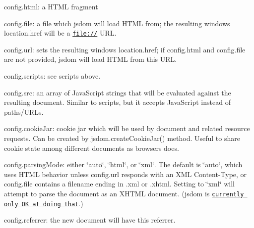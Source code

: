 \begin{DoxyItemize}
\item {\ttfamily config.\+html}\+: a H\+T\+ML fragment
\item {\ttfamily config.\+file}\+: a file which jsdom will load H\+T\+ML from; the resulting window\textquotesingle{}s {\ttfamily location.\+href} will be a {\ttfamily \href{file://}{\tt file\+://}} U\+RL.
\item {\ttfamily config.\+url}\+: sets the resulting window\textquotesingle{}s {\ttfamily location.\+href}; if {\ttfamily config.\+html} and {\ttfamily config.\+file} are not provided, jsdom will load H\+T\+ML from this U\+RL.
\item {\ttfamily config.\+scripts}\+: see {\ttfamily scripts} above.
\item {\ttfamily config.\+src}\+: an array of Java\+Script strings that will be evaluated against the resulting document. Similar to {\ttfamily scripts}, but it accepts Java\+Script instead of paths/\+U\+R\+Ls.
\item {\ttfamily config.\+cookie\+Jar}\+: cookie jar which will be used by document and related resource requests. Can be created by {\ttfamily jsdom.\+create\+Cookie\+Jar()} method. Useful to share cookie state among different documents as browsers does.
\item {\ttfamily config.\+parsing\+Mode}\+: either {\ttfamily \char`\"{}auto\char`\"{}}, {\ttfamily \char`\"{}html\char`\"{}}, or {\ttfamily \char`\"{}xml\char`\"{}}. The default is {\ttfamily \char`\"{}auto\char`\"{}}, which uses H\+T\+ML behavior unless {\ttfamily config.\+url} responds with an X\+ML {\ttfamily Content-\/\+Type}, or {\ttfamily config.\+file} contains a filename ending in {\ttfamily .xml} or {\ttfamily .xhtml}. Setting to {\ttfamily \char`\"{}xml\char`\"{}} will attempt to parse the document as an X\+H\+T\+ML document. (jsdom is \href{https://github.com/tmpvar/jsdom/issues/885}{\tt currently only OK at doing that}.)
\item {\ttfamily config.\+referrer}\+: the new document will have this referrer.

\end{DoxyItemize}
